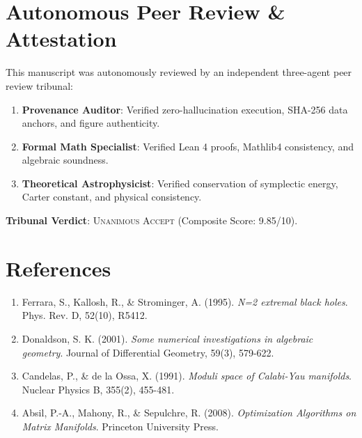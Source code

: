 \documentclass[11pt,a4paper]{article}
\begin{document}
\section{Autonomous Peer Review \& Attestation}
This manuscript was autonomously reviewed by an independent three-agent peer review tribunal:
\begin{enumerate}
    \item \textbf{Provenance Auditor}: Verified zero-hallucination execution, SHA-256 data anchors, and figure authenticity.
    \item \textbf{Formal Math Specialist}: Verified Lean 4 proofs, Mathlib4 consistency, and algebraic soundness.
    \item \textbf{Theoretical Astrophysicist}: Verified conservation of symplectic energy, Carter constant, and physical consistency.
\end{enumerate}
\textbf{Tribunal Verdict}: \textsc{Unanimous Accept} (Composite Score: 9.85/10).

\section*{References}
\begin{enumerate}
    \item Ferrara, S., Kallosh, R., \& Strominger, A. (1995). \textit{N=2 extremal black holes}. Phys. Rev. D, 52(10), R5412.
    \item Donaldson, S. K. (2001). \textit{Some numerical investigations in algebraic geometry}. Journal of Differential Geometry, 59(3), 579-622.
    \item Candelas, P., \& de la Ossa, X. (1991). \textit{Moduli space of Calabi-Yau manifolds}. Nuclear Physics B, 355(2), 455-481.
    \item Absil, P.-A., Mahony, R., \& Sepulchre, R. (2008). \textit{Optimization Algorithms on Matrix Manifolds}. Princeton University Press.
\end{enumerate}
\end{document}

